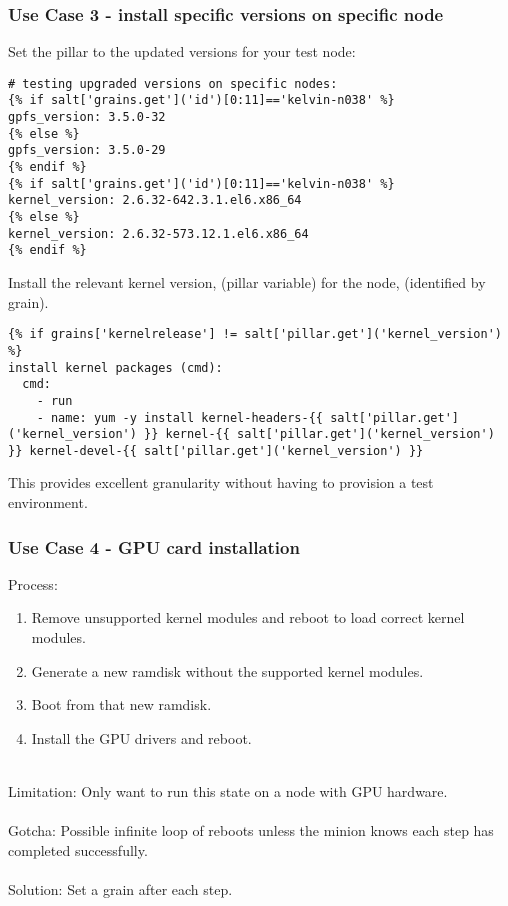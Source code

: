\documentclass{beamer}
\begin{document}
\begin{frame}[fragile]
\frametitle{Use Case 3 - install specific versions on specific node}

Set the pillar to the updated versions for your test node:\\

\begin{lstlisting}[basicstyle=\tiny,]
# testing upgraded versions on specific nodes:
{% if salt['grains.get']('id')[0:11]=='kelvin-n038' %}
gpfs_version: 3.5.0-32
{% else %}
gpfs_version: 3.5.0-29
{% endif %}
{% if salt['grains.get']('id')[0:11]=='kelvin-n038' %}
kernel_version: 2.6.32-642.3.1.el6.x86_64
{% else %}
kernel_version: 2.6.32-573.12.1.el6.x86_64
{% endif %}
\end{lstlisting}

Install the relevant kernel version, (pillar variable) for the node, (identified by grain).

\begin{lstlisting}[basicstyle=\tiny,]
{% if grains['kernelrelease'] != salt['pillar.get']('kernel_version') %}
install kernel packages (cmd):
  cmd:
    - run
    - name: yum -y install kernel-headers-{{ salt['pillar.get']('kernel_version') }} kernel-{{ salt['pillar.get']('kernel_version') }} kernel-devel-{{ salt['pillar.get']('kernel_version') }}
\end{lstlisting}

This provides excellent granularity without having to provision a test environment.

\end{frame} 

\begin{frame}
\frametitle{Use Case 4 - GPU card installation}
Process:\\
\begin{enumerate}%
\item Remove unsupported kernel modules and reboot to load correct kernel modules.
\item Generate a new ramdisk without the supported kernel modules.
\item Boot from that new ramdisk.
\item Install the GPU drivers and reboot.\\~\\ %
\end{enumerate}

Limitation: Only want to run this state on a node with GPU hardware.\\~\\

Gotcha: Possible infinite loop of reboots unless the minion knows each step has completed successfully.\\~\\

Solution: Set a grain after each step.
\end{frame}
\end{document}
